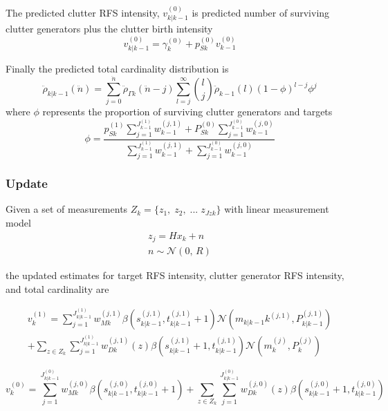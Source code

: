 \documentclass{article}
\newcommand{\clut}{{(0)}}
\newcommand{\tgt}{{(1)}}
\newcommand{\clutj}{{(j,0)}}
\newcommand{\tgtj}{{(j,1)}}
\begin{document}
The predicted clutter RFS intensity, $v_{k|k-1}^\clut$ is  predicted number of surviving clutter generators plus the clutter birth intensity \cite{cphd}
\begin{equation}
  \label{eq:lpd_v0_predict}
  v_{k|k-1}^\clut = \gamma_k^\clut + p_{Sk}^\clut v_{k-1}^\clut
\end{equation}

Finally the predicted total cardinality distribution is \cite{cphd}
\begin{equation}
  \label{eq:lpd_rho_predict}
 \ddot{\rho}_{k|k-1}(\ddot{n}) = \sum_{j=0}^{\ddot{n}}\ddot{\rho}_{\Gamma k}(\ddot{n} - j) \sum_{l=j}^\infty {l \choose j}\ddot{\rho}_{k-1}(l)(1-\phi)^{l-j}\phi^j
\end{equation}
where $\phi$ represents the proportion of surviving clutter generators and targets
\begin{equation}
  \label{eq:lpd_phi}
  \phi = \frac{p_{Sk}^\tgt\sum_{j=1}^{J_{k-1}^\tgt}w_{k-1}^\tgtj + P_{Sk}^\clut \sum_{j=1}^{J_{k-1}^\clut}w_{k-1}^\clutj}{\sum_{j=1}^{J_{k-1}^\tgt}w_{k-1}^\tgtj + \sum_{j=1}^{J_{k-1}^\clut}w_{k-1}^\clutj}
\end{equation}

\subsubsection*{Update}

Given a set of measurements $Z_k = \{z_1,\;z_2,\;...\;z_{Jzk}\}$ with linear measurement model
\begin{align}
  \label{eq:lpd_z}
  z_j = Hx_k + n\\
  n\sim \mathcal{N}(0,\,R)
\end{align}

the updated estimates for target RFS intensity, clutter generator RFS intensity, and total cardinality are \cite{cphd}

\begin{equation}
  \label{eq:lpd_vk}
  \begin{aligned}
    v^\tgt_k = \sum_{j=1}^{J_{k|k-1}^\tgt}w_{Mk}^\tgtj \beta(s_{k|k-1}^{(j, 1)}, t_{k|k-1}^{(j, 1)}+1) \mathcal{N}(m_{k|k-1}k^\tgtj,P_{k|k-1}^\tgtj) \\
    + \sum_{z \in Z_k}\sum_{j=1}^{J_{k|k-1}^\tgt}w_{Dk}^\tgtj(z) \beta(s_{k|k-1}^{(j, 1)}+1, t_{k|k-1}^{(j, 1)})  \mathcal{N}(m_k^{(j)},P_k^{(j)})
  \end{aligned}
\end{equation}

\begin{equation}
  \label{eq:N0k}
  v^\clut_k = \sum_{j=1}^{J_{k|k-1}^\clut}w_{Mk}^\clutj \beta(s_{k|k-1}^\clutj, t_{k|k-1}^\clutj+1)
  + \sum_{z \in Z_k}\sum_{j=1}^{J_{k|k-1}^\clut}w_{Dk}^\clutj(z) \beta(s_{k|k-1}^\clutj+1, t_{k|k-1}^\clutj)  
\end{equation}
  
\end{document}
